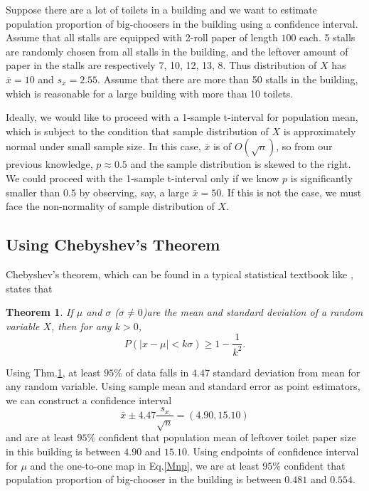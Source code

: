 \documentclass{article}
\newtheorem{theorem}{Theorem}
\begin{document}
Suppose there are a lot of toilets in a building and we want to estimate population proportion of big-choosers in the building using a confidence interval. Assume that all stalls are equipped with 2-roll paper of length $100$ each. 5 stalls are randomly chosen from all stalls in the building, and the leftover amount of paper in the stalls are respectively 7, 10, 12, 13, 8. Thus distribution of $X$ has $\bar{x}=10$ and $s_x = 2.55$. Assume that there are more than 50 stalls in the building, which is reasonable for a large building with more than 10 toilets. 

Ideally, we would like to proceed with a 1-sample t-interval for population mean, which is subject to the condition that sample distribution of $X$ is approximately normal under small sample size. In this case, $\bar{x}$ is of $O(\sqrt{n})$, so from our previous knowledge, $p \approx 0.5$ and the sample distribution is skewed to the right. We could proceed with the 1-sample t-interval only if we know $p$ is significantly smaller than $0.5$ by observing, say, a large $\bar{x}=50$. If this is not the case, we must face the non-normality of sample distribution of $X$.

\subsection{Using Chebyshev's Theorem}
Chebyshev's theorem, which can be found in a typical statistical textbook like \cite{Freund}, states that 
\begin{theorem}
If $\mu$ and $\sigma$ ($\sigma \neq 0$)are the mean and standard deviation of a random variable $X$, then for any $k>0$,
\[
P(|x-\mu| < k\sigma) \geq 1-\frac{1}{k^2}.
\]
\label{Chebyshev's theorem}
\end{theorem}
Using Thm.\ref{Chebyshev's theorem}, at least $95\%$ of data falls in $4.47$ standard deviation from mean for any random variable. Using sample mean and standard error as point estimators, we can construct a confidence interval 
\begin{equation}
    \bar{x} \pm 4.47 \frac{s_x}{\sqrt{n}}
    =(4.90,15.10)
\end{equation}
and are at least $95\%$ confident that population mean of leftover toilet paper size in this building is between $4.90$ and $15.10$. Using endpoints of confidence interval for $\mu$ and the one-to-one map in Eq.\eqref{Mnp}, we are at least $95\%$ confident that population proportion of big-chooser in the building is between $0.481$ and $0.554$. 
\end{document}
